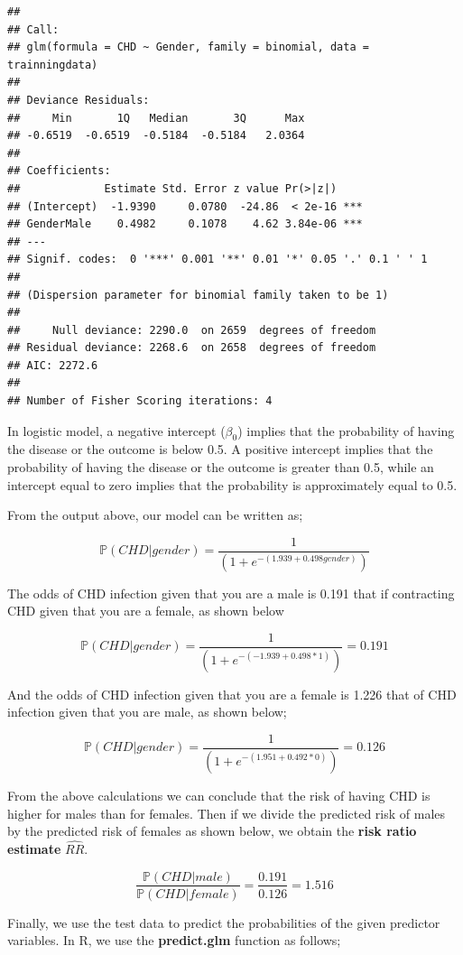 \documentclass[
]{article}
\begin{document}
\begin{lstlisting}
## 
## Call:
## glm(formula = CHD ~ Gender, family = binomial, data = trainningdata)
## 
## Deviance Residuals: 
##     Min       1Q   Median       3Q      Max  
## -0.6519  -0.6519  -0.5184  -0.5184   2.0364  
## 
## Coefficients:
##             Estimate Std. Error z value Pr(>|z|)    
## (Intercept)  -1.9390     0.0780  -24.86  < 2e-16 ***
## GenderMale    0.4982     0.1078    4.62 3.84e-06 ***
## ---
## Signif. codes:  0 '***' 0.001 '**' 0.01 '*' 0.05 '.' 0.1 ' ' 1
## 
## (Dispersion parameter for binomial family taken to be 1)
## 
##     Null deviance: 2290.0  on 2659  degrees of freedom
## Residual deviance: 2268.6  on 2658  degrees of freedom
## AIC: 2272.6
## 
## Number of Fisher Scoring iterations: 4
\end{lstlisting}

In logistic model, a negative intercept (\(\beta_0\)) implies that the
probability of having the disease or the outcome is below 0.5. A
positive intercept implies that the probability of having the disease or
the outcome is greater than 0.5, while an intercept equal to zero
implies that the probability is approximately equal to 0.5.

From the output above, our model can be written as;

\[\mathbb{P}(CHD|gender)=\frac{1}{(1+e^{-(1.939+0.498gender)})}\]

The odds of CHD infection given that you are a male is 0.191 that if
contracting CHD given that you are a female, as shown below

\[\mathbb{P}(CHD|gender)=\frac{1}{(1+e^{-(-1.939+0.498*1)})}=0.191\]

And the odds of CHD infection given that you are a female is 1.226 that
of CHD infection given that you are male, as shown below;

\[\mathbb{P}(CHD|gender)=\frac{1}{(1+e^{-(1.951+0.492*0)})}=0.126\]

From the above calculations we can conclude that the risk of having CHD
is higher for males than for females. Then if we divide the predicted
risk of males by the predicted risk of females as shown below, we obtain
the \textbf{risk ratio estimate} \(\hat{RR}\).

\[\frac{\mathbb{P}(CHD|male)}{\mathbb{P}(CHD|female)}=\frac{0.191}{0.126}=1.516\]

Finally, we use the test data to predict the probabilities of the given
predictor variables. In R, we use the \textbf{predict.glm} function as
follows;
\end{document}

